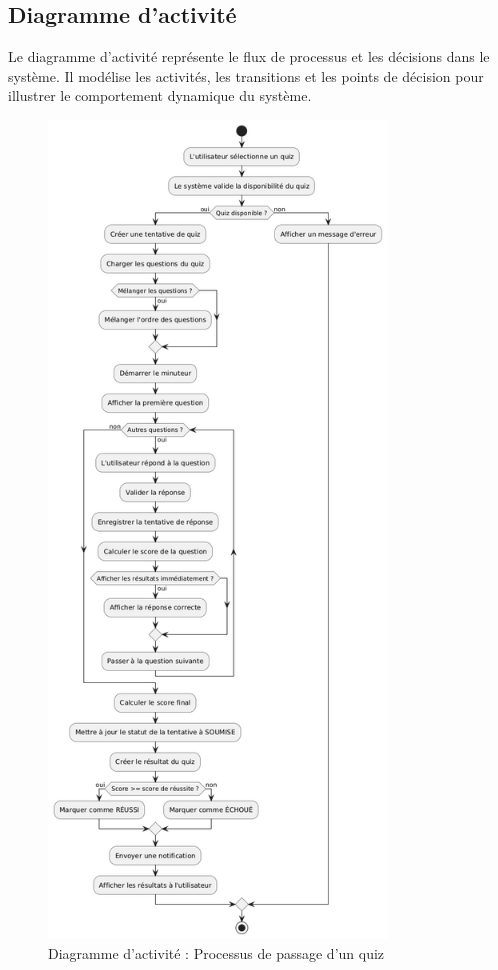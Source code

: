 \documentclass[12pt,a4paper]{report}
\begin{document}
\subsection{Diagramme d'activité}

Le diagramme d'activité représente le flux de processus et les décisions dans le système. Il modélise les activités, les transitions et les points de décision pour illustrer le comportement dynamique du système.

\begin{figure}[htbp]
    \centering
    \includegraphics[width=0.8\textwidth]{latex_media/media/activity_diagramme_passer_quiz.png}
    \caption{Diagramme d'activité : Processus de passage d'un quiz}
    \label{fig:activite-passer-quiz}
\end{figure}
\end{document}

